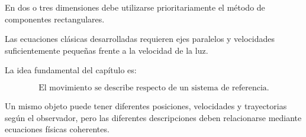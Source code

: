 \begin{resumen}
En dos o tres dimensiones debe utilizarse
prioritariamente el método de componentes rectangulares.

Las ecuaciones clásicas desarrolladas
requieren ejes paralelos y velocidades
suficientemente pequeñas frente a
la velocidad de la luz.

La idea fundamental del capítulo es:

\[
\boxed{
\text{El movimiento se describe
respecto de un sistema de referencia.}
}
\]

Un mismo objeto puede tener diferentes
posiciones, velocidades y trayectorias
según el observador, pero las diferentes
descripciones deben relacionarse
mediante ecuaciones físicas coherentes.

\end{resumen}